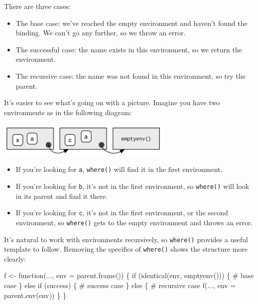 \documentclass[oneside]{book}
\newenvironment{Shaded}{}{}
\newcommand{\KeywordTok} [1]{\textcolor[rgb]{0.00,0.44,0.13}{{#1}}}
\newcommand{\DataTypeTok}[1]{\textcolor[rgb]{0.56,0.13,0.00}{{#1}}}
\newcommand{\StringTok}  [1]{\textcolor[rgb]{0.25,0.44,0.63}{{#1}}}
\newcommand{\CommentTok} [1]{\textcolor[rgb]{0.38,0.63,0.69}{{#1}}}
\newcommand{\NormalTok}  [1]{{#1}}
\begin{document}
There are three cases:

\begin{itemize}
\item
  The base case: we've reached the empty environment and haven't found
  the binding. We can't go any further, so we throw an error.
\item
  The successful case: the name exists in this environment, so we return
  the environment.
\item
  The recursive case: the name was not found in this environment, so try
  the parent.
\end{itemize}

It's easier to see what's going on with a picture. Imagine you have two
environments as in the following diagram:

\includegraphics[width=3.32in,height=0.65in]{diagrams/environments.png/where-ex.png}

\begin{itemize}
\item
  If you're looking for \texttt{a}, \texttt{where()} will find it in the
  first environment.
\item
  If you're looking for \texttt{b}, it's not in the first environment,
  so \texttt{where()} will look in its parent and find it there.
\item
  If you're looking for \texttt{c}, it's not in the first environment,
  or the second environment, so \texttt{where()} gets to the empty
  environment and throws an error.
\end{itemize}

It's natural to work with environments recursively, so \texttt{where()}
provides a useful template to follow. Removing the specifics of
\texttt{where()} shows the structure more clearly:

\begin{Shaded}
\begin{Highlighting}[]
\NormalTok{f <-}\StringTok{ }\NormalTok{function(..., }\DataTypeTok{env =} \KeywordTok{parent.frame}\NormalTok{()) \{}
  \NormalTok{if (}\KeywordTok{identical}\NormalTok{(env, }\KeywordTok{emptyenv}\NormalTok{())) \{}
    \CommentTok{# base case}
  \NormalTok{\} else if (success) \{}
    \CommentTok{# success case}
  \NormalTok{\} else \{}
    \CommentTok{# recursive case}
    \KeywordTok{f}\NormalTok{(..., }\DataTypeTok{env =} \KeywordTok{parent.env}\NormalTok{(env))}
  \NormalTok{\}}
\NormalTok{\}}
\end{Highlighting}
\end{Shaded}
\end{document}

